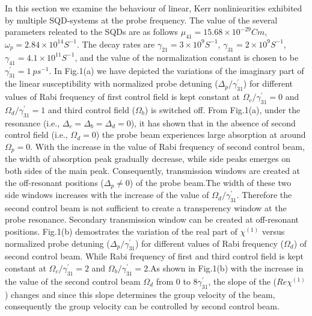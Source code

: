 \documentclass[12pt,a4paper]{article}
\begin{document}
In this section we examine the behaviour of linear, Kerr nonliniearities exhibited by multiple SQD-systems at the probe frequency. The value of the several parameters releated to the SQDs are as follows \(\mu_{41} = 15.68\times10^{-29} Cm\), \(\omega_p = 2.84\times10^{14} S^{-1}\). The decay rates are \(\gamma_{21}=3\times10^9S^{-1}\), \( \gamma_{31}=2\times10^9S^{-1} \), \( \gamma_{41}=4.1\times10^{11}S^{-1} \), and the value of the normalization constant is chosen to be \( \gamma^{\prime}_{31}=1\ ps^{-1} \). In Fig.1(a) we have depicted the variations of the imaginary part of the linear susceptibility with normalized probe detuning ($\Delta_p/\gamma^{\prime}_{31}$) for different values of Rabi frequency of first control field is kept constant at $\Omega_c/\gamma^{\prime}_{31}=0$ and $\Omega_d/\gamma^{\prime}_{31}=1$ and third control field ($\Omega_b$) is switched off. From Fig.1(a), under the resonance (i.e., $\Delta_c = \Delta_b = \Delta_d = 0$), it has shown that in the absence of second control field (i.e., $\Omega_d = 0$) the probe beam experiences large absorption at around $\Omega_p=0$. With the increase in the value of Rabi frequency of second control beam, the width of absorption peak gradually decrease, while side peaks emerges on both sides of the main peak. Consequently, transmission windows are created at the off-resonant positions ($\Delta_p \neq 0$) of the probe beam.The width of these two side windows increases with the increase of the value of $\Omega_d/\gamma^{\prime}_{31}$. Therefore the second control beam is not sufficient to create a transperency window at the probe resonance. Secondary transmission window can be created at off-resonant positions. Fig.1(b) demostrates the variation of the real part of $\chi^{(1)}$ versus normalized probe detuning ($\Delta_p/\gamma^{\prime}_{31}$) for different values of Rabi frequency ($\Omega_{d}$) of second control beam. While Rabi frequency of first and third control field is kept constant at $\Omega_{c}/\gamma^{\prime}_{31}=2$ and $\Omega_{b}/\gamma^{\prime}_{31}=2$.As shown in Fig.1(b) with the increase in the value of the second control beam $\Omega_{d}$ from $0$ to $8\gamma^{\prime}_{31}$, the slope of the ($Re\chi^{(1)}$) changes and since this slope determines the group velocity of the beam, consequently the group velocity can be controlled by second control beam. \par
\end{document}
